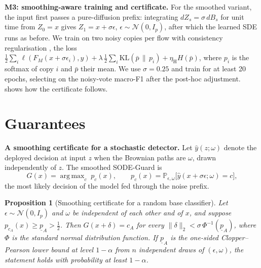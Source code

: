 \documentclass{article}
\newtheorem{proposition}{Proposition}
\theoremstyle{definition}
\newcommand{\Prob}{\mathbb{P}}
\DeclareMathOperator*{\argmax}{arg\,max}
\begin{document}
\textbf{M3: smoothing-aware training and certificate.} For the smoothed
variant, the input first passes a pure-diffusion prefix: integrating
$dZ_s=\sigma\,dB_s$ for unit time from $Z_0=x$ gives $Z_1=x+\sigma\epsilon$,
$\epsilon\sim\mathcal N(0,I_p)$, after which the learned SDE runs as before. We
train on two noisy copies per flow with consistency regularisation
\citep{jeong2020consistency}, the loss
$\tfrac12\sum_i\ell(F_M(x+\sigma\epsilon_i),y)
+\lambda\,\tfrac12\sum_i\mathrm{KL}(\bar p\,\|\,p_i)+\eta_{\mathrm H}H(\bar p)$, where
$p_i$ is the softmax of copy $i$ and $\bar p$ their mean. We use $\sigma=0.25$
and train for at least 20 epochs, selecting on the noisy-vote macro-F1 after
the post-hoc adjustment.  shows how the certificate follows.

\section{Guarantees}\label{sec:theory}
\textbf{A smoothing certificate for a stochastic detector.} Let
$\hat y(z;\omega)$ denote the deployed decision at input $z$ when the Brownian
paths are $\omega$, drawn independently of $z$. The smoothed SODE-Guard is
\begin{equation}\label{eq:smoothed}
  G(x)=\argmax_c\;p_c(x),\qquad p_c(x)=\Prob_{\epsilon,\omega}\bigl[\hat y(x+\sigma\epsilon;\omega)=c\bigr],
\end{equation}
the most likely decision of the model fed through the noise prefix.

\begin{proposition}[Smoothing certificate for a random base classifier]\label{prop:smooth}
Let $\epsilon\sim\mathcal N(0,I_p)$ and $\omega$ be independent of each other
and of $x$, and suppose $p_{c_A}(x)\ge\underline p_A>\tfrac12$. Then
$G(x+\delta)=c_A$ for every $\|\delta\|_2<\sigma\,\Phi^{-1}(\underline p_A)$,
where $\Phi$ is the standard normal distribution function. If
$\underline p_A$ is the one-sided Clopper--Pearson lower bound at level
$1-\alpha$ from $n$ independent draws of $(\epsilon,\omega)$, the statement holds
with probability at least $1-\alpha$.
\end{proposition}
\end{document}
